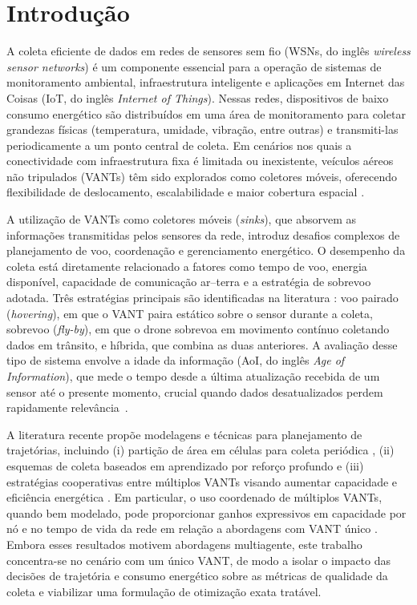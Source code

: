 \chapter{Introdução}
\label{sec:introducao}

A coleta eficiente de dados em redes de sensores sem fio (WSNs, do inglês \textit{wireless sensor networks}) é um componente essencial para a operação de sistemas de monitoramento ambiental, infraestrutura inteligente e aplicações em Internet das Coisas (IoT, do inglês \textit{Internet of Things}). Nessas redes, dispositivos de baixo consumo energético são distribuídos em uma área de monitoramento para coletar grandezas físicas (temperatura, umidade, vibração, entre outras) e transmiti-las periodicamente a um ponto central de coleta. Em cenários nos quais a conectividade com infraestrutura fixa é limitada ou inexistente, veículos aéreos não tripulados (VANTs) têm sido explorados como coletores móveis, oferecendo flexibilidade de deslocamento, escalabilidade e maior cobertura espacial \cite{liu2018uavWSN}.

A utilização de VANTs como coletores móveis (\emph{sinks}), que absorvem as informações transmitidas pelos sensores da rede, introduz desafios complexos de planejamento de voo, coordenação e gerenciamento energético. O desempenho da coleta está diretamente relacionado a fatores como tempo de voo, energia disponível, capacidade de comunicação ar–terra e a estratégia de sobrevoo adotada. Três estratégias principais são identificadas na literatura \cite{messaoudi2023survey}: voo pairado (\textit{hovering}), em que o VANT paira estático sobre o sensor durante a coleta, sobrevoo (\textit{fly-by}), em que o drone sobrevoa em movimento contínuo coletando dados em trânsito, e híbrida, que combina as duas anteriores. A avaliação desse tipo de sistema envolve a idade da informação (AoI, do inglês \emph{Age of Information}), que mede o tempo desde a última atualização recebida de um sensor até o presente momento, crucial quando dados desatualizados perdem rapidamente relevância~\cite{messaoudi2023survey}.

A literatura recente propõe modelagens e técnicas para planejamento de trajetórias, incluindo (i) partição de área em células para coleta periódica \cite{liu2018uavWSN}, (ii) esquemas de coleta baseados em aprendizado por reforço profundo \cite{zhang2018drlrvc} e (iii) estratégias cooperativas entre múltiplos VANTs visando aumentar capacidade e eficiência energética \cite{yang2020surveyUAVIoT}. Em particular, o uso coordenado de múltiplos VANTs, quando bem modelado, pode proporcionar ganhos expressivos em capacidade por nó e no tempo de vida da rede em relação a abordagens com VANT único \cite{liu2018uavWSN,yang2020surveyUAVIoT}. Embora esses resultados motivem abordagens multiagente, este trabalho concentra-se no cenário com um único VANT, de modo a isolar o impacto das decisões de trajetória e consumo energético sobre as métricas de qualidade da coleta e viabilizar uma formulação de otimização exata tratável.

